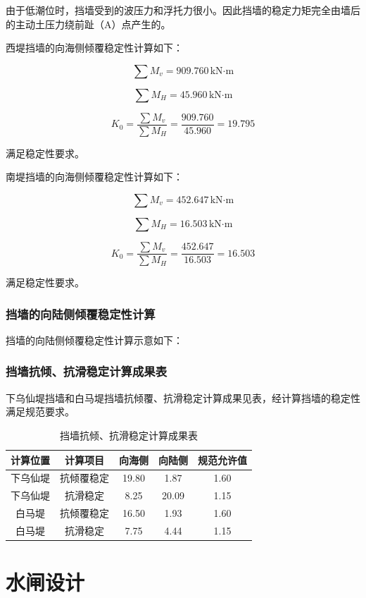 \documentclass[UTF8, a4paper, 12pt]{ctexart} %
\begin{document}
由于低潮位时，挡墙受到的波压力和浮托力很小。因此挡墙的稳定力矩完全由墙后的主动土压力绕前趾（A）点产生的。

西堤挡墙的向海侧倾覆稳定性计算如下：

\[
\sum M_v = 909.760\,\text{kN·m}
\]

\[
\sum M_H = 45.960\,\text{kN·m}
\]

\[
K_0 = \frac{\sum M_v}{\sum M_H} = \frac{909.760}{45.960} = 19.795
\]

满足稳定性要求。

南堤挡墙的向海侧倾覆稳定性计算如下：

\[
\sum M_v = 452.647\,\text{kN·m}
\]

\[
\sum M_H = 16.503\,\text{kN·m}
\]

\[
K_0 = \frac{\sum M_v}{\sum M_H} = \frac{452.647}{16.503} = 16.503
\]

满足稳定性要求。


\subsubsection{挡墙的向陆侧倾覆稳定性计算}

挡墙的向陆侧倾覆稳定性计算示意如下：

\subsubsection{挡墙抗倾、抗滑稳定计算成果表}
下乌仙堤挡墙和白马堤挡墙抗倾覆、抗滑稳定计算成果见表，经计算挡墙的稳定性满足规范要求。

\begin{table}[h]
    \centering
    \caption{挡墙抗倾、抗滑稳定计算成果表}
    \begin{tabular}{|c|c|c|c|c|}
        \hline
        \textbf{计算位置} & \textbf{计算项目} & \textbf{向海侧} & \textbf{向陆侧} & \textbf{规范允许值} \\ \hline
        下乌仙堤 & 抗倾覆稳定 & 19.80 & 1.87 & 1.60 \\ \hline
        下乌仙堤 & 抗滑稳定 & 8.25 & 20.09 & 1.15 \\ \hline
        白马堤 & 抗倾覆稳定 & 16.50 & 1.93 & 1.60 \\ \hline
        白马堤 & 抗滑稳定 & 7.75 & 4.44 & 1.15 \\ \hline
    \end{tabular}
    \label{tab:stability_results}
\end{table}
\section{水闸设计}
\end{document}
